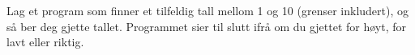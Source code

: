 %
%
Lag et program som finner et tilfeldig tall mellom 1 og 10 (grenser inkludert), og så ber deg gjette tallet. Programmet sier til slutt ifrå om du gjettet for høyt, for lavt eller riktig.
